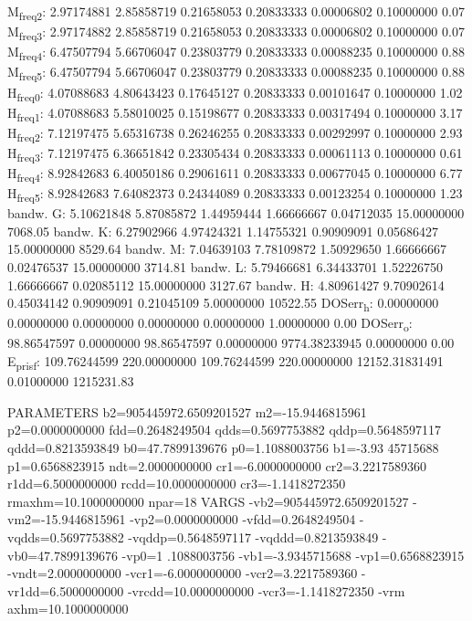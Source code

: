 \documentclass[11pt]{article}
\begin{document}
M\textsubscript{freq}\textsubscript{2}:   2.97174881   2.85858719   0.21658053   0.20833333   0.00006802   0.10000000         0.07
M\textsubscript{freq}\textsubscript{3}:   2.97174882   2.85858719   0.21658053   0.20833333   0.00006802   0.10000000         0.07
M\textsubscript{freq}\textsubscript{4}:   6.47507794   5.66706047   0.23803779   0.20833333   0.00088235   0.10000000         0.88
M\textsubscript{freq}\textsubscript{5}:   6.47507794   5.66706047   0.23803779   0.20833333   0.00088235   0.10000000         0.88
H\textsubscript{freq}\textsubscript{0}:   4.07088683   4.80643423   0.17645127   0.20833333   0.00101647   0.10000000         1.02
H\textsubscript{freq}\textsubscript{1}:   4.07088683   5.58010025   0.15198677   0.20833333   0.00317494   0.10000000         3.17
H\textsubscript{freq}\textsubscript{2}:   7.12197475   5.65316738   0.26246255   0.20833333   0.00292997   0.10000000         2.93
H\textsubscript{freq}\textsubscript{3}:   7.12197475   6.36651842   0.23305434   0.20833333   0.00061113   0.10000000         0.61
H\textsubscript{freq}\textsubscript{4}:   8.92842683   6.40050186   0.29061611   0.20833333   0.00677045   0.10000000         6.77
H\textsubscript{freq}\textsubscript{5}:   8.92842683   7.64082373   0.24344089   0.20833333   0.00123254   0.10000000         1.23
bandw. G:   5.10621848   5.87085872   1.44959444   1.66666667   0.04712035  15.00000000      7068.05
bandw. K:   6.27902966   4.97424321   1.14755321   0.90909091   0.05686427  15.00000000      8529.64
bandw. M:   7.04639103   7.78109872   1.50929650   1.66666667   0.02476537  15.00000000      3714.81
bandw. L:   5.79466681   6.34433701   1.52226750   1.66666667   0.02085112  15.00000000      3127.67
bandw. H:   4.80961427   9.70902614   0.45034142   0.90909091   0.21045109   5.00000000     10522.55
DOSerr\textsubscript{h}:   0.00000000   0.00000000   0.00000000   0.00000000   0.00000000   1.00000000         0.00
DOSerr\textsubscript{o}:  98.86547597   0.00000000  98.86547597   0.00000000 9774.38233945   0.00000000         0.00
E\textsubscript{pris}\textsubscript{f}: 109.76244599 220.00000000 109.76244599 220.00000000 12152.31831491   0.01000000   1215231.83


PARAMETERS
  b2=905445972.6509201527 m2=-15.9446815961 p2=0.0000000000 fdd=0.2648249504 qdds=0.5697753882 qddp=0.5648597117 qddd=0.8213593849 b0=47.7899139676 p0=1.1088003756 b1=-3.93
45715688 p1=0.6568823915 ndt=2.0000000000 cr1=-6.0000000000 cr2=3.2217589360 r1dd=6.5000000000 rcdd=10.0000000000 cr3=-1.1418272350 rmaxhm=10.1000000000 npar=18 
VARGS
    -vb2=905445972.6509201527 -vm2=-15.9446815961 -vp2=0.0000000000 -vfdd=0.2648249504 -vqdds=0.5697753882 -vqddp=0.5648597117 -vqddd=0.8213593849 -vb0=47.7899139676 -vp0=1
.1088003756 -vb1=-3.9345715688 -vp1=0.6568823915 -vndt=2.0000000000 -vcr1=-6.0000000000 -vcr2=3.2217589360 -vr1dd=6.5000000000 -vrcdd=10.0000000000 -vcr3=-1.1418272350 -vrm
axhm=10.1000000000 
\end{document}
